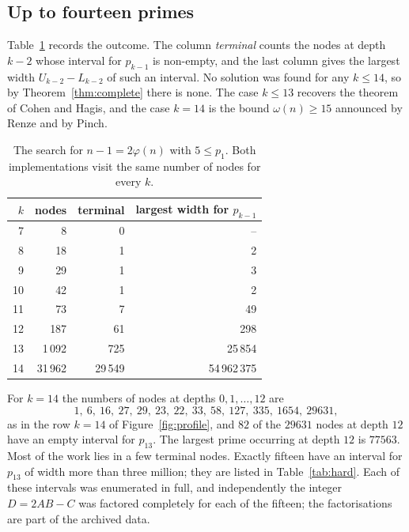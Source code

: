 \documentclass[11pt,reqno]{amsart}
\numberwithin{equation}{section}
\theoremstyle{plain}
\theoremstyle{definition}
\theoremstyle{remark}
\begin{document}
\subsection{Up to fourteen primes}

Table~\ref{tab:first} records the outcome. The column \emph{terminal}
counts the nodes at depth $k-2$ whose interval for $p_{k-1}$ is
non-empty, and the last column gives the largest width $U_{k-2}-L_{k-2}$
of such an interval. No solution was found for any $k\le14$, so by
Theorem~\ref{thm:complete} there is none. The case $k\le13$ recovers
the theorem of Cohen and Hagis, and the case $k=14$ is the bound
$\omega(n)\ge15$ announced by Renze and by Pinch.

\begin{table}[ht]
\centering
\caption{The search for $n-1=2\varphi(n)$ with $5\le p_1$. Both
implementations visit the same number of nodes for every $k$.}
\label{tab:first}
\smallskip
\begin{tabular}{@{}rrrr@{}}
\toprule
$k$ & nodes & terminal & largest width for $p_{k-1}$ \\
\midrule
 7 &      8 &      0 &            -- \\
 8 &     18 &      1 &             2 \\
 9 &     29 &      1 &             3 \\
10 &     42 &      1 &             2 \\
11 &     73 &      7 &            49 \\
12 &    187 &     61 &           298 \\
13 & 1\,092 &    725 &       25\,854 \\
14 & 31\,962 & 29\,549 & 54\,962\,375 \\
\bottomrule
\end{tabular}
\end{table}

For $k=14$ the numbers of nodes at depths $0,1,\dots,12$ are
\[
  1,\ 6,\ 16,\ 27,\ 29,\ 23,\ 22,\ 33,\ 58,\ 127,\ 335,\ 1654,\ 29631,
\]
as in the row $k=14$ of Figure~\ref{fig:profile}, and $82$ of the $29631$ nodes at depth $12$ have an empty interval for
$p_{13}$. The largest prime occurring at depth $12$ is $77563$. Most of
the work lies in a few terminal nodes. Exactly
fifteen have an interval for $p_{13}$ of width more than three million;
they are listed in Table~\ref{tab:hard}. Each of these intervals was
enumerated in full, and independently the integer $D=2AB-C$ was
factored completely for each of the fifteen; the factorisations are
part of the archived data.
\end{document}
